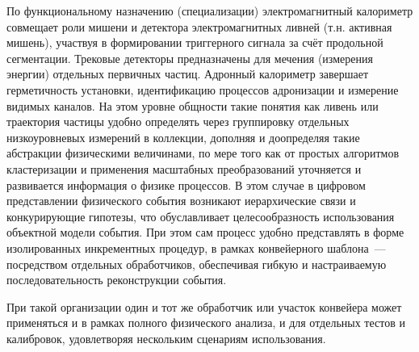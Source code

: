 По функциональному назначению (специализации) электромагнитный калориметр
совмещает роли мишени и детектора электромагнитных
ливней (т.н. активная мишень), участвуя в формировании триггерного
сигнала за счёт продольной сегментации. Трековые
детекторы предназначены для мечения (измерения энергии) отдельных
первичных частиц. Адронный калориметр завершает герметичность
установки, идентификацию процессов адронизации и измерение видимых
каналов. На этом уровне общности такие понятия как ливень
или траектория частицы удобно определять через группировку
отдельных низкоуровневых измерений в коллекции, дополняя
и доопределяя такие абстракции физическими величинами, по мере того
как от простых алгоритмов кластеризации и применения масштабных
преобразований уточняется и развивается информация о физике
процессов. В этом случае
в цифровом представлении физического события возникают
иерархические связи и конкурирующие гипотезы, что обуславливает
целесообразность использования объектной
модели события. При этом сам процесс удобно представлять в
форме изолированных инкрементных процедур,
в рамках конвейерного шаблона~--- посредством отдельных
обработчиков, обеспечивая гибкую и настраиваемую последовательность
реконструкции события.

При такой организации один и тот же обработчик
или участок конвейера может применяться и в рамках полного физического
анализа, и для отдельных тестов и калибровок, удовлетворяя нескольким
сценариям использования.

